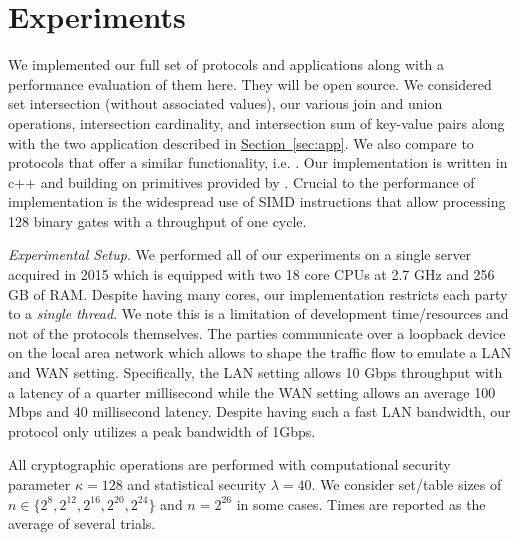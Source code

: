 \documentclass[11pt,letterpaper]{article}
\newcommand{\namedref}[2]{\hyperref[#2]{#1~\ref*{#2}}}
\newcommand{\sectionref}[1]{\namedref{Section}{#1}}
\renewcommand{\paragraph}[1]{\vspace{0.1cm}\noindent\emph{#1}.}
\begin{document}
 

\section{Experiments}\label{sec:eval}


We implemented our full set of protocols and applications along with a performance evaluation of them here. They will be open source. We considered set intersection (without associated values), our various join and union operations, intersection cardinality, and intersection sum of key-value pairs along with the two application described in \sectionref{sec:app}. We also compare to protocols that offer a similar functionality, i.e. \cite{CCS:KKRT16, PSWW18,ASIACCS:BlaAgu12,DBLP:conf/cans/CristofaroGT12,cryptoeprint:2017:738}. Our implementation is written in c++ and building on primitives provided by \cite{libOTe}. Crucial to the performance of implementation is the widespread use of SIMD instructions that allow processing 128 binary gates with a throughput of one cycle.



\paragraph{Experimental Setup} We performed all of our experiments on a single server acquired in 2015 which is equipped with two 18 core CPUs at 2.7 GHz and 256 GB of RAM. Despite having many cores, our implementation restricts each party to a \emph{single thread}. We note this is a limitation of development time/resources and not of the protocols themselves. The parties communicate over a loopback device on the local area network which allows to shape the traffic flow to emulate a LAN and WAN setting. Specifically, the LAN setting allows 10 Gbps throughput with a latency of a quarter millisecond while the WAN setting allows an average 100 Mbps and 40 millisecond latency. Despite having such a fast LAN bandwidth, our protocol only utilizes a peak bandwidth of 1Gbps. 

All cryptographic operations are performed with computational security parameter $\kappa=128$ and statistical security $\lambda=40$. We consider set/table sizes of $n\in\{2^8, 2^{12}, 2^{16}, 2^{20}, 2^{24}\}$ and $n=2^{26}$ in some cases. Times are reported as the average of several trials.
\end{document}
